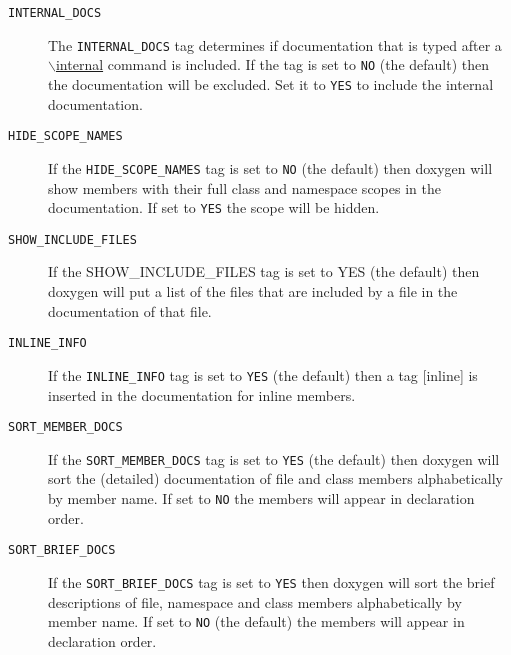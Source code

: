 \begin{description}
\label{config_cfg_internal_docs}
\hypertarget{config_cfg_internal_docs}{}
 \item[{\tt INTERNAL\_\-DOCS} ] The {\tt INTERNAL\_\-DOCS} tag determines if documentation that is typed after a \hyperlink{commands_cmdinternal}{$\backslash$internal} command is included. If the tag is set to {\tt NO} (the default) then the documentation will be excluded. Set it to {\tt YES} to include the internal documentation.

\label{config_cfg_hide_scope_names}
\hypertarget{config_cfg_hide_scope_names}{}
 \item[{\tt HIDE\_\-SCOPE\_\-NAMES} ] If the {\tt HIDE\_\-SCOPE\_\-NAMES} tag is set to {\tt NO} (the default) then doxygen will show members with their full class and namespace scopes in the documentation. If set to {\tt YES} the scope will be hidden.

\label{config_cfg_show_include_files}
\hypertarget{config_cfg_show_include_files}{}
 \item[{\tt SHOW\_\-INCLUDE\_\-FILES} ] If the SHOW\_\-INCLUDE\_\-FILES tag is set to YES (the default) then doxygen will put a list of the files that are included by a file in the documentation of that file.

\label{config_cfg_inline_info}
\hypertarget{config_cfg_inline_info}{}
 \item[{\tt INLINE\_\-INFO} ] If the {\tt INLINE\_\-INFO} tag is set to {\tt YES} (the default) then a tag \mbox{[}inline\mbox{]} is inserted in the documentation for inline members.

\label{config_cfg_sort_member_docs}
\hypertarget{config_cfg_sort_member_docs}{}
 \item[{\tt SORT\_\-MEMBER\_\-DOCS} ] If the {\tt SORT\_\-MEMBER\_\-DOCS} tag is set to {\tt YES} (the default) then doxygen will sort the (detailed) documentation of file and class members alphabetically by member name. If set to {\tt NO} the members will appear in declaration order.

\label{config_cfg_sort_brief_docs}
\hypertarget{config_cfg_sort_brief_docs}{}
 \item[{\tt SORT\_\-BRIEF\_\-DOCS} ] If the {\tt SORT\_\-BRIEF\_\-DOCS} tag is set to {\tt YES} then doxygen will sort the brief descriptions of file, namespace and class members alphabetically by member name. If set to {\tt NO} (the default) the members will appear in declaration order.


\end{description}
